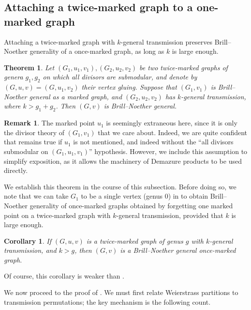 \documentclass[11pt]{article}
\newtheorem{theorem}[theo]{Theorem}
\newtheorem{coro}[theo]{Corollary}
\theoremstyle{definition}
\newtheorem{rema}[theo]{Remark}
\numberwithin{equation}{section}
\begin{document}
\subsection{Attaching a twice-marked graph to a one-marked graph}

Attaching a twice-marked graph with $k$-general transmission preserves Brill--Noether generality of a once-marked graph, as long as $k$ is large enough.

\begin{theorem}\label{thm:glueBNGtoKGT}
Let $(G_1, u_1, v_1), (G_2, u_2, v_2)$ be two twice-marked graphs of genera $g_1,g_2$ on which all divisors are submodular, and denote by $(G,u,v) = (G, u_1, v_2)$ their vertex gluing.
Suppose that $(G_1,v_1)$ is Brill--Noether general as a marked graph, and $(G_2, u_2,v_2)$ has $k$-general transmission, where $k > g_1 + g_2$. Then $(G,v)$ is Brill--Noether general.
\end{theorem}

\begin{rema}
The marked point $u_1$ is seemingly extraneous here, since it is only the divisor theory of $(G_1,v_1)$ that we care about. Indeed, we are quite confident that  remains true if $u_1$ is not mentioned, and indeed without the ``all divisors submodular on $(G_1,u_1,v_1)$'' hypothesis. However, we include this assumption to simplify exposition, as it allows the machinery of Demazure products to be used directly.
\end{rema}

We establish this theorem in the course of this subsection. Before doing so, we note that we can take $G_1$ to be a single vertex (genus $0$) in  to obtain Brill--Noether generality of once-marked graphs obtained by forgetting one marked point on a twice-marked graph with $k$-general transmission, provided that $k$ is large enough.

\begin{coro}
If $(G,u,v)$ is a twice-marked graph of genus $g$ with $k$-general transmission, and $k > g$, then $(G,v)$ is a Brill--Noether general once-marked graph.
\end{coro}

Of course, this corollary is weaker than .

We now proceed to the proof of . We must first relate Weierstrass partitions to transmission permutations; the key mechanism is the following count.
\end{document}
